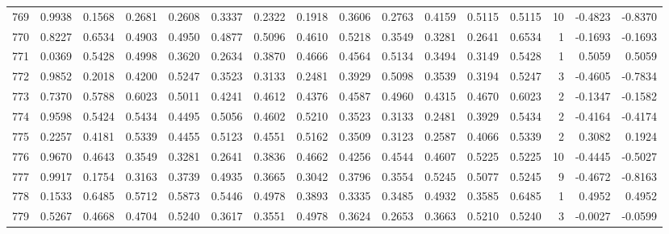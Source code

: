 \begin{tabular}{lrrrrrrrrrrrrrrr}
769 &      0.9938 &  0.1568 &  0.2681 &  0.2608 &  0.3337 &  0.2322 &  0.1918 &  0.3606 &  0.2763 &  0.4159 &   0.5115 &     0.5115 &     10 &                   -0.4823 &                    -0.8370 \\
770 &      0.8227 &  0.6534 &  0.4903 &  0.4950 &  0.4877 &  0.5096 &  0.4610 &  0.5218 &  0.3549 &  0.3281 &   0.2641 &     0.6534 &      1 &                   -0.1693 &                    -0.1693 \\
771 &      0.0369 &  0.5428 &  0.4998 &  0.3620 &  0.2634 &  0.3870 &  0.4666 &  0.4564 &  0.5134 &  0.3494 &   0.3149 &     0.5428 &      1 &                    0.5059 &                     0.5059 \\
772 &      0.9852 &  0.2018 &  0.4200 &  0.5247 &  0.3523 &  0.3133 &  0.2481 &  0.3929 &  0.5098 &  0.3539 &   0.3194 &     0.5247 &      3 &                   -0.4605 &                    -0.7834 \\
773 &      0.7370 &  0.5788 &  0.6023 &  0.5011 &  0.4241 &  0.4612 &  0.4376 &  0.4587 &  0.4960 &  0.4315 &   0.4670 &     0.6023 &      2 &                   -0.1347 &                    -0.1582 \\
774 &      0.9598 &  0.5424 &  0.5434 &  0.4495 &  0.5056 &  0.4602 &  0.5210 &  0.3523 &  0.3133 &  0.2481 &   0.3929 &     0.5434 &      2 &                   -0.4164 &                    -0.4174 \\
775 &      0.2257 &  0.4181 &  0.5339 &  0.4455 &  0.5123 &  0.4551 &  0.5162 &  0.3509 &  0.3123 &  0.2587 &   0.4066 &     0.5339 &      2 &                    0.3082 &                     0.1924 \\
776 &      0.9670 &  0.4643 &  0.3549 &  0.3281 &  0.2641 &  0.3836 &  0.4662 &  0.4256 &  0.4544 &  0.4607 &   0.5225 &     0.5225 &     10 &                   -0.4445 &                    -0.5027 \\
777 &      0.9917 &  0.1754 &  0.3163 &  0.3739 &  0.4935 &  0.3665 &  0.3042 &  0.3796 &  0.3554 &  0.5245 &   0.5077 &     0.5245 &      9 &                   -0.4672 &                    -0.8163 \\
778 &      0.1533 &  0.6485 &  0.5712 &  0.5873 &  0.5446 &  0.4978 &  0.3893 &  0.3335 &  0.3485 &  0.4932 &   0.3585 &     0.6485 &      1 &                    0.4952 &                     0.4952 \\
779 &      0.5267 &  0.4668 &  0.4704 &  0.5240 &  0.3617 &  0.3551 &  0.4978 &  0.3624 &  0.2653 &  0.3663 &   0.5210 &     0.5240 &      3 &                   -0.0027 &                    -0.0599 \\

\end{tabular}

